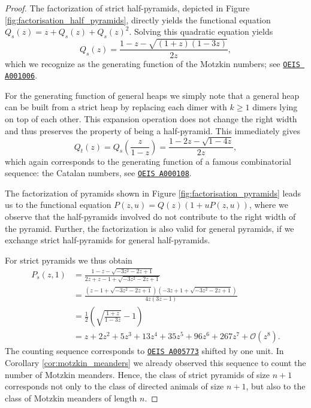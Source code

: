\begin{proof}
The factorization of strict half-pyramids, depicted in Figure \ref{fig:factorisation_half_pyramids}, directly yields the functional equation $Q_s(z) = z + Q_s(z) + Q_s(z)^2$. Solving this quadratic equation yields 
$$
  Q_s(z) = \frac{1 - z - \sqrt{(1+z)(1-3z)}}{2z},
$$ 
which we recognize as the generating function of the Motzkin numbers; see \href{https://oeis.org/A001006}{\texttt{OEIS A001006}}. 

For the generating function of general heaps we simply note that a general heap can be built from a strict heap by replacing each dimer with $k \geq 1$ dimers lying on top of each other. This expansion operation does not change the right width and thus preserves the property of being a half-pyramid. This immediately gives 
$$
  Q_t(z) = Q_s\left(\frac{z}{1-z}\right) = \frac{1 - 2z - \sqrt{1 - 4z}}{2z},
$$ 
which again corresponds to the generating function of a famous combinatorial sequence: the Catalan numbers, see \href{https://oeis.org/A000108}{\texttt{OEIS A000108}}. 

The factorization of pyramids shown in Figure \ref{fig:factorisation_pyramids} leads us to the functional equation $P(z,u) = Q(z)(1 + uP(z,u))$, where we observe that the half-pyramids involved do not contribute to the right width of the pyramid. Further, the factorization is also valid for general pyramids, if we exchange strict half-pyramids for general half-pyramids.

For strict pyramids we thus obtain
\begin{align*}
  P_s(z,1) &= \frac{1 - z -\sqrt{-3 z^{2}-2 z +1}}{2 z + z - 1 + \sqrt{-3 z^{2}-2 z +1}} \\
  &= \frac{\left(z -1+\sqrt{-3 z^{2}-2 z +1}\right) \left(-3 z +1+\sqrt{-3 z^{2}-2 z +1}\right)}{4 z \left(3 z -1\right)} \\
  &= \frac{1}{2}\left( \sqrt{\frac{1+z}{1-3z}} - 1\right) \\
  &= z + 2z^2 + 5z^3 + 13z^4 + 35z^5 + 96z^6 + 267z^7 + \mathcal{O}(z^{8}).
\end{align*}
The counting sequence corresponds to \href{https://oeis.org/A005773}{\texttt{OEIS A005773}} shifted by one unit. In Corollary \ref{cor:motzkin_meanders} we already observed this sequence to count the number of Motzkin meanders. Hence, the class of strict pyramids of size $n + 1$ corresponds not only to the class of directed animals of size $n + 1$, but also to the class of Motzkin meanders of length $n$.
\end{proof}

